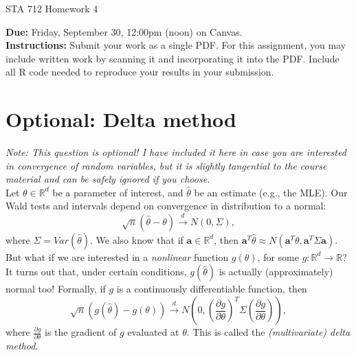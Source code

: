 \documentclass[11pt]{article}
\begin{document}
\begin{center}
\Large
STA 712 Homework 4\\
\normalsize
\vspace{5mm}
\end{center}

\noindent \textbf{Due:} Friday, September 30, 12:00pm (noon) on Canvas.\\ 

\noindent \textbf{Instructions:} Submit your work as a single PDF. For this assignment, you may include written work by scanning it and incorporating it into the PDF. Include all R code needed to reproduce your results in your submission.

\section*{Optional: Delta method}

\textit{Note: This question is optional! I have included it here in case you are interested in convergence of random variables, but it is slightly tangential to the course material and can be safely ignored if you choose.}\\

\noindent Let $\theta \in \mathbb{R}^d$ be a parameter of interest, and $\widehat{\theta}$ be an estimate (e.g., the MLE). Our Wald tests and intervals depend on convergence in distribution to a normal:
$$\sqrt{n}(\widehat{\theta} - \theta) \overset{d}{\to} N(0, \Sigma),$$
where $\Sigma = Var(\widehat{\theta})$. We also know that if $\bm{a} \in \mathbb{R}^d$, then $\bm{a}^T \widehat{\theta} \approx N(\bm{a}^T \theta, \bm{a}^T \Sigma \bm{a})$.\\

\noindent But what if we are interested in a \textit{nonlinear} function $g(\theta)$, for some $g: \mathbb{R}^d \to \mathbb{R}$? It turns out that, under certain conditions, $g(\widehat{\theta})$ is actually (approximately) normal too! Formally, if $g$ is a continuously differentiable function, then
$$\sqrt{n}(g(\widehat{\theta}) - g(\theta)) \overset{d}{\to} N\left(0, \left( \frac{\partial g}{\partial \theta} \right)^T \Sigma \left( \frac{\partial g}{\partial \theta} \right) \right),$$
where $\frac{\partial g}{\partial \theta}$ is the gradient of $g$ evaluated at $\theta$. This is called the \textit{(multivariate) delta method}.\\
\end{document}

